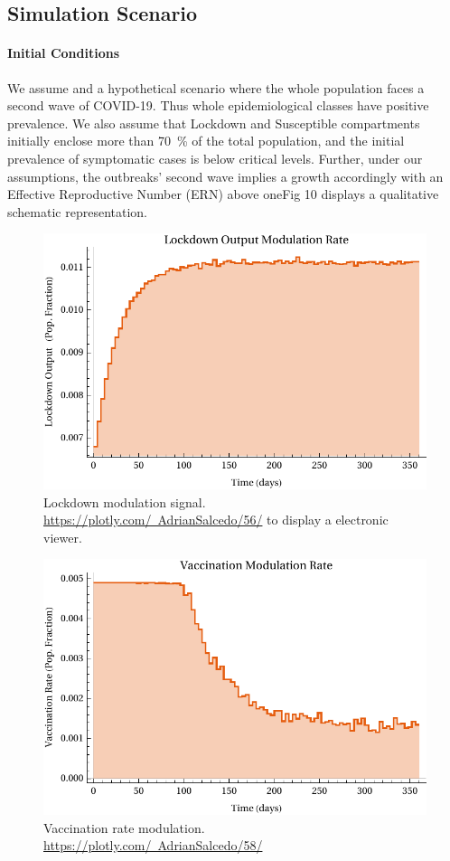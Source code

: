 \subsection*{Simulation Scenario}
\paragraph*{Initial Conditions}
    We assume and a hypothetical scenario where the whole population faces a 
    second wave of COVID-19. Thus whole epidemiological classes have positive 
    prevalence. We also assume that Lockdown and Susceptible compartments 
    initially enclose more than \SI{70}{\percent} of the total population, 
    and the initial prevalence of symptomatic cases is below critical levels. 
    Further, under our assumptions, the outbreaks'
    second wave implies a growth accordingly with an Effective Reproductive 
    Number (ERN) above one\textemdash Fig 10 displays a 
    qualitative schematic representation.

\begin{figure}[tbh]
    \centering
    \includegraphics[width=0.7\linewidth]{figs/lockdown_control_signal}
    \caption[Lockdown modulation signal.]{Lockdown modulation signal.
    \href{https://plotly.com/~AdrianSalcedo/56/}
    {https://plotly.com/~AdrianSalcedo/56/}
            to display a electronic viewer.}
    \label{fig:lockdowncontrolsignal}
\end{figure}

\begin{figure}
    \centering
    \includegraphics[width=0.7\linewidth]{figs/Vaccination_control_signal}
    \caption[Vaccination rate modulation.]{Vaccination rate modulation.
    \href{https://plotly.com/~AdrianSalcedo/58/}
    {https://plotly.com/~AdrianSalcedo/58/}}
    \label{fig:vaccinationcontrolsignal}
\end{figure}

